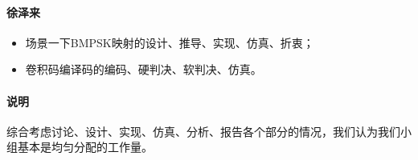 \paragraph{徐泽来}
\indent

\begin{itemize}
    \item 场景一下BMPSK映射的设计、推导、实现、仿真、折衷；
    \item 卷积码编译码的编码、硬判决、软判决、仿真。	
\end{itemize}	

\paragraph{说明}
\indent

综合考虑讨论、设计、实现、仿真、分析、报告各个部分的情况，我们认为我们小组基本是均匀分配的工作量。

